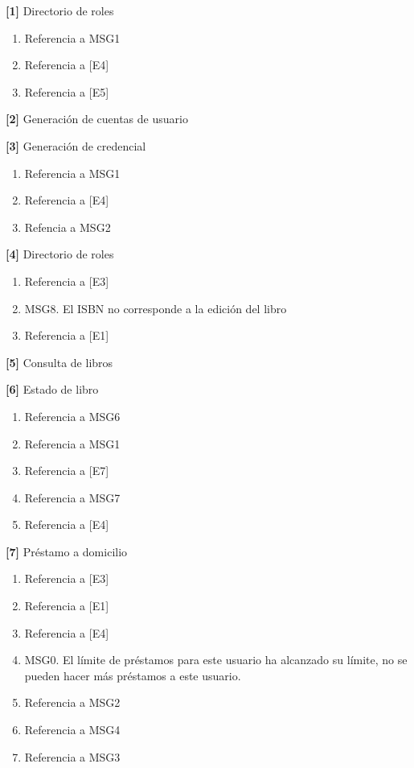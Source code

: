 \begin{Citemize}
	\item {\bf [1]} Directorio de roles
		\begin{enumerate}
			\item Referencia a MSG1
			\item Referencia a [E4]
			\item Referencia a [E5] 
		\end{enumerate}
	\item {\bf [2]} Generación de cuentas de usuario
	\item {\bf [3]} Generación de credencial
		\begin{enumerate}
			\item Referencia a MSG1
			\item Referencia a [E4]
			\item Refencia a MSG2
		\end{enumerate}		 
	\item {\bf [4]} Directorio de roles
		\begin{enumerate}
			\item Referencia a [E3]
			\item MSG8. El ISBN no corresponde a la edición del libro
			\item Referencia a [E1]	
		\end{enumerate}
	\item {\bf [5]} Consulta de libros
	\item {\bf [6]} Estado de libro
		\begin{enumerate}
			\item Referencia a MSG6
			\item Referencia a MSG1
			\item Referencia a [E7]
			\item Referencia a MSG7
			\item Referencia a [E4]
		\end{enumerate}
	\item {\bf [7]} Préstamo a domicilio
		\begin{enumerate}
			\item Referencia a [E3]
			\item Referencia a [E1]
			\item Referencia a [E4]
			\item MSG0. El límite de préstamos para este usuario ha alcanzado su límite, no se pueden hacer más préstamos a este usuario.
			\item Referencia a MSG2
			\item Referencia a MSG4
			\item Referencia a MSG3

\end{enumerate}
\end{Citemize}

